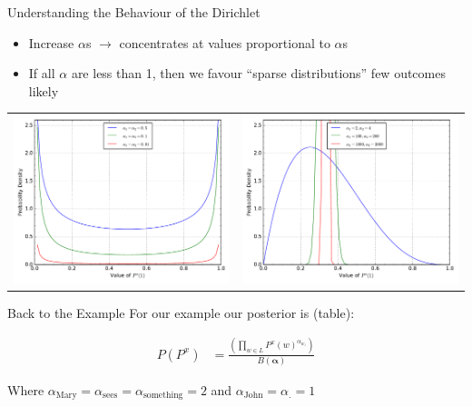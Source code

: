 \documentclass[11pt]{beamer}
\begin{document}
	\begin{frame}{Understanding the Behaviour of the Dirichlet}
		\begin{itemize}
			\item Increase $\alpha$s $\rightarrow$ concentrates at values proportional to $\alpha$s
			\item If all $\alpha$ are less than 1, then we favour ``sparse distributions'' few outcomes likely
		\end{itemize}
		
		\begin{tabular}{lr}
			\includegraphics[width=0.49\linewidth]{dirichlet_distribution_sparse_pdf} &
			\includegraphics[width=0.49\linewidth]{dirichlet_distribution_dense_pdf} \\
		\end{tabular}
	\end{frame}
		
	\begin{frame}{Back to the Example}
		For our example our posterior is (table):

		\vspace{10pt}		
		\begin{align*}
			P(P^x) & = \frac{\left(\prod_{w \in L} P^{x}(w)^{\alpha_{w_i}}\right)}{B(\boldsymbol{\alpha})}
		\end{align*}
		
		\vspace{10pt} Where $\alpha_{\text{Mary}}=\alpha_{\text{sees}} = \alpha_{\text{something}} = 2$ and $\alpha_{\text{John}}=\alpha_{\text{.}}=1$
	\end{frame}
	
\end{document}

